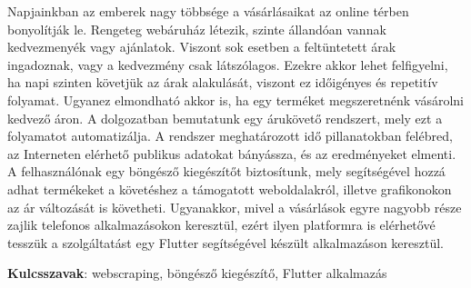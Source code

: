 Napjainkban az emberek nagy többsége a vásárlásaikat az online térben bonyolítják le. Rengeteg webáruház létezik, szinte állandóan vannak kedvezmenyék vagy ajánlatok. Viszont sok esetben a feltüntetett árak ingadoznak, vagy a kedvezmény csak látszólagos. Ezekre akkor lehet felfigyelni, ha napi szinten követjük az árak alakulását, viszont ez időigényes és repetitív folyamat. Ugyanez elmondható akkor is, ha egy terméket megszeretnénk vásárolni kedvező áron. 
A dolgozatban bemutatunk egy árukövető rendszert, mely ezt a folyamatot automatizálja. 
A rendszer meghatározott idő pillanatokban felébred, az Interneten elérhető publikus adatokat bányássza, és az eredményeket elmenti. A felhasználónak egy böngésző kiegészítőt biztosítunk, mely segítségével hozzá adhat termékeket a követéshez a támogatott weboldalakról, illetve grafikonokon az ár változását is követheti. 
Ugyanakkor, mivel a vásárlások egyre nagyobb része zajlik telefonos alkalmazásokon keresztül, ezért ilyen platformra is elérhetővé tesszük a szolgáltatást egy Flutter segítségével készült alkalmazáson keresztül.

\textbf{Kulcsszavak}: webscraping, böngésző kiegészítő, Flutter alkalmazás